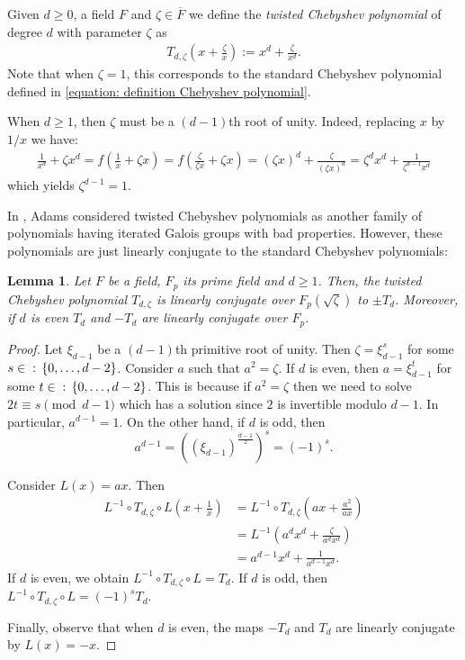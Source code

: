 \documentclass{amsart}
\def\set#1{{\def\st{\;:\;}\left\{#1\right\}}}
\DeclareMathOperator{\st}{st}
\newtheorem{lemma}[proposition]{Lemma}
\theoremstyle{definition}
\begin{document}
Given $d \geq 0$, a field $F$ and $\zeta \in \overline{F}$ we define the \textit{twisted Chebyshev polynomial} of degree $d$ with parameter $\zeta$ as 
\begin{align*}
T_{d,\zeta} \left( x + \frac{\zeta}{x} \right) := x^d + \frac{\zeta}{x^d}.
\end{align*}
Note that when $\zeta = 1$, this corresponds to the standard Chebyshev polynomial defined in \cref{equation: definition Chebyshev polynomial}.

When $d \geq 1$, then $\zeta$ must be a $(d-1)$th root of unity. Indeed, replacing $x$ by $1/x$ we have:
\begin{align*}
\frac{1}{x^d} + \zeta x^d = f \left( \frac{1}{x} + \zeta x \right) = f \left( \frac{\zeta}{\zeta x} + \zeta x \right) = (\zeta x)^d + \frac{\zeta}{(\zeta x)^d} = \zeta^d x^d + \frac{1}{\zeta^{d-1} x^d} 
\end{align*}
which yields $\zeta^{d-1} = 1$.

In \cite{Adams2025}, Adams considered twisted Chebyshev polynomials as another family of polynomials having iterated Galois groups with bad properties. However, these polynomials are just linearly conjugate to the standard Chebyshev polynomials:

\begin{lemma}
Let $F$ be a field, $F_p$ its prime field and $d \geq 1$. Then, the twisted Chebyshev polynomial $T_{d,\zeta}$ is linearly conjugate over $F_p(\sqrt{\zeta})$ to $\pm T_d$. Moreover, if $d$ is even $T_d$ and $-T_d$ are linearly conjugate over $F_p$.
\label{lemma: Chebyshev and twisted Chebyshev}
\end{lemma}

\begin{proof}
Let $\xi_{d-1}$ be a $(d-1)$th primitive root of unity. Then $\zeta = \xi_{d-1}^s$ for some $s \in \set{0, \dots, d-2}$. Consider $a$ such that $a^2 = \zeta$. If $d$ is even, then $a = \xi_{d-1}^t$ for some $t \in \set{0, \dots, d-2}$. This is because if $a^2 = \zeta$ then we need to solve $2t \equiv s \pmod{d-1}$ which has a solution since $2$ is invertible modulo $d-1$. In particular, $a^{d-1} = 1$. On the other hand, if $d$ is odd, then  $$a^{d-1} = \left((\xi_{d-1})^{\frac{d-1}{2}}\right)^s = (-1)^s.$$

Consider $L(x) = a x$. Then 
\begin{align*}
L^{-1} \circ T_{d, \zeta} \circ L \left( x + \frac{1}{x}  \right) &= L^{-1} \circ T_{d, \zeta} \left( a x + \frac{a^2}{a x}  \right) \\
&= L^{-1} \left( a^d x^d + \frac{\zeta}{a^d x^d}  \right) \\
&= a^{d-1} x^d + \frac{1}{a^{d-1} x^d}.
\end{align*}
If $d$ is even, we obtain $L^{-1} \circ T_{d, \zeta} \circ L = T_d$. If $d$ is odd, then $L^{-1} \circ T_{d, \zeta} \circ L = (-1)^s T_d$.  

Finally, observe that when $d$ is even, the maps $-T_d$ and $T_d$ are linearly conjugate by $L(x) = -x$.
\end{proof}
\end{document}
